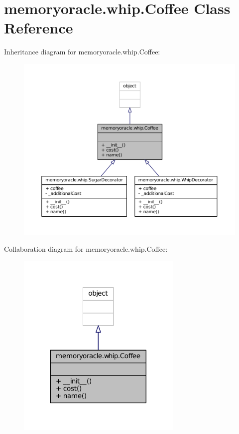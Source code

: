 \hypertarget{classmemoryoracle_1_1whip_1_1Coffee}{}\section{memoryoracle.\+whip.\+Coffee Class Reference}
\label{classmemoryoracle_1_1whip_1_1Coffee}


Inheritance diagram for memoryoracle.\+whip.\+Coffee\+:\nopagebreak
\begin{figure}[H]
\begin{center}
\leavevmode
\includegraphics[width=350pt]{classmemoryoracle_1_1whip_1_1Coffee__inherit__graph}
\end{center}
\end{figure}


Collaboration diagram for memoryoracle.\+whip.\+Coffee\+:\nopagebreak
\begin{figure}[H]
\begin{center}
\leavevmode
\includegraphics[width=224pt]{classmemoryoracle_1_1whip_1_1Coffee__coll__graph}
\end{center}
\end{figure}
